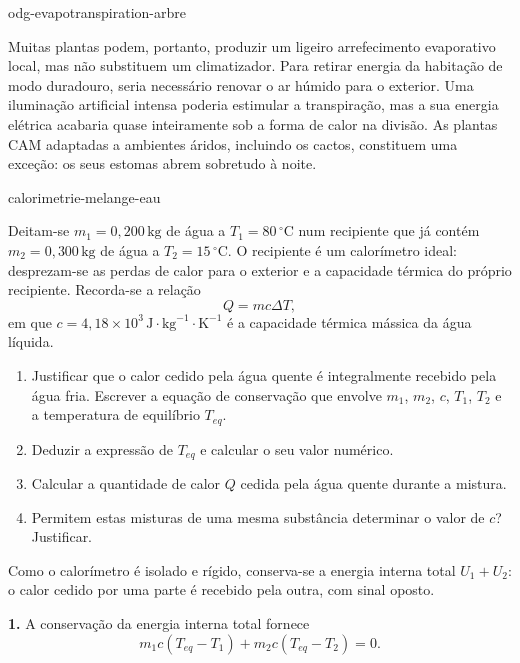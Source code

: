 \begin{exo}{odg-evapotranspiration-arbre}
\begin{solution}
Muitas plantas podem, portanto, produzir um ligeiro arrefecimento evaporativo local, mas não substituem um climatizador. Para retirar energia da habitação de modo duradouro, seria necessário renovar o ar húmido para o exterior. Uma iluminação artificial intensa poderia estimular a transpiração, mas a sua energia elétrica acabaria quase inteiramente sob a forma de calor na divisão. As plantas CAM adaptadas a ambientes áridos, incluindo os cactos, constituem uma exceção: os seus estomas abrem sobretudo à noite.
\end{solution}
\end{exo}

\begin{exo}{calorimetrie-melange-eau}

Deitam-se $m_1=0{,}200\,\text{kg}$ de água a $T_1=80\,^\circ\text{C}$ num recipiente que já contém $m_2=0{,}300\,\text{kg}$ de água a $T_2=15\,^\circ\text{C}$. O recipiente é um calorímetro ideal: desprezam-se as perdas de calor para o exterior e a capacidade térmica do próprio recipiente. Recorda-se a relação
\[
Q=mc\Delta T,
\]
em que $c=4{,}18\times10^3\,\text{J}\!\cdot\!\text{kg}^{-1}\!\cdot\!\text{K}^{-1}$ é a capacidade térmica mássica da água líquida.

\begin{enumerate}
  \item Justificar que o calor cedido pela água quente é integralmente recebido pela água fria. Escrever a equação de conservação que envolve $m_1$, $m_2$, $c$, $T_1$, $T_2$ e a temperatura de equilíbrio $T_{eq}$.
  \item Deduzir a expressão de $T_{eq}$ e calcular o seu valor numérico.
  \item Calcular a quantidade de calor $Q$ cedida pela água quente durante a mistura.
  \item Permitem estas misturas de uma mesma substância determinar o valor de $c$? Justificar.
\end{enumerate}

\begin{indication}
Como o calorímetro é isolado e rígido, conserva-se a energia interna total $U_1+U_2$: o calor cedido por uma parte é recebido pela outra, com sinal oposto.
\end{indication}

\begin{solution}
\textbf{1.} A conservação da energia interna total fornece
\[
m_1c(T_{eq}-T_1)+m_2c(T_{eq}-T_2)=0.
\]


\end{solution}
\end{exo}
